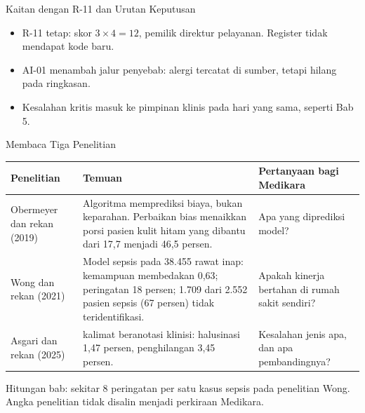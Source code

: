 \documentclass[aspectratio=169, table, 12pt]{beamer}
\begin{document}
\begin{frame}{{\Large Kaitan dengan R-11 dan Urutan Keputusan}}
  \vspace{2pt}
  \begin{center}
    \resizebox{0.86\textwidth}{!}{}
  \end{center}
  \vspace{-4pt}
  \footnotesize
  \begin{itemize}
    \item R-11 tetap: skor $3 \times 4 = 12$, pemilik direktur pelayanan. Register tidak mendapat
          kode baru.
    \item AI-01 menambah jalur penyebab: alergi tercatat di sumber, tetapi hilang pada ringkasan.
    \item Kesalahan kritis masuk ke pimpinan klinis pada hari yang sama, seperti Bab 5.
  \end{itemize}
\end{frame}

\begin{frame}{{\Large Membaca Tiga Penelitian}}
  \vspace{2pt}
  \scriptsize
  \begin{tabularx}{\textwidth}{|>{\raggedright\arraybackslash}p{}|>{\raggedright\arraybackslash}X|>{\raggedright\arraybackslash}p{}|}
    \hline
    \textbf{Penelitian} & \textbf{Temuan} & \textbf{Pertanyaan bagi Medikara} \\ \hline
    Obermeyer dan rekan (2019) & Algoritma memprediksi biaya, bukan keparahan. Perbaikan bias
    menaikkan porsi pasien kulit hitam yang dibantu dari 17,7 menjadi 46,5 persen. & Apa yang
    diprediksi model? \\ \hline
    Wong dan rekan (2021) & Model sepsis pada 38.455 rawat inap: kemampuan membedakan 0,63;
    peringatan 18 persen; 1.709 dari 2.552 pasien sepsis (67 persen) tidak teridentifikasi. &
    Apakah kinerja bertahan di rumah sakit sendiri? \\ \hline
    Asgari dan rekan (2025) & 12.999 kalimat beranotasi klinisi: halusinasi 1,47 persen,
    penghilangan 3,45 persen. & Kesalahan jenis apa, dan apa pembandingnya? \\ \hline
  \end{tabularx}

  \vspace{6pt}
  \small Hitungan bab: sekitar 8 peringatan per satu kasus sepsis pada penelitian Wong. Angka
  penelitian tidak disalin menjadi perkiraan Medikara.
\end{frame}
\end{document}
